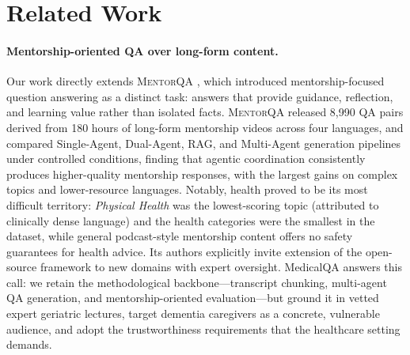 \section{Related Work}
\label{sec:related}


\paragraph{Mentorship-oriented QA over long-form content.}
Our work directly extends \textsc{MentorQA} \citep{bhalerao2026mentorqa},
which introduced mentorship-focused question answering as a distinct task:
answers that provide guidance, reflection, and learning value rather than
isolated facts. \textsc{MentorQA} released 8,990 QA pairs derived from 180
hours of long-form mentorship videos across four languages, and compared
Single-Agent, Dual-Agent, RAG, and Multi-Agent generation pipelines under
controlled conditions, finding that agentic coordination consistently
produces higher-quality mentorship responses, with the largest gains on
complex topics and lower-resource languages. Notably, health proved to be
its most difficult territory: \emph{Physical Health} was the lowest-scoring
topic (attributed to clinically dense language) and the health categories
were the smallest in the dataset, while general podcast-style mentorship
content offers no safety guarantees for health advice. Its authors
explicitly invite extension of the open-source framework to new domains
with expert oversight. MedicalQA answers this call: we retain the
methodological backbone---transcript chunking, multi-agent QA generation,
and mentorship-oriented evaluation---but ground it in vetted expert
geriatric lectures, target dementia caregivers as a concrete, vulnerable
audience, and adopt the trustworthiness requirements that the healthcare
setting demands.

